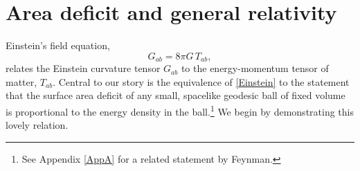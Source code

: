 \documentclass[aps,prd,showpacs,groupedaddress,nofootinbib,longbibliography,12pt]{revtex4-1}
\def\beq{\begin{equation}}
\def\eeq{\end{equation}}
\begin{document}

\section{Area deficit and general relativity}

Einstein's field equation, 
%
\beq\label{Einstein}
G_{ab} = 8\pi G\, T_{ab},
\eeq
%
relates the Einstein curvature tensor $G_{ab}$ to the energy-momentum tensor of matter, $T_{ab}$.
Central to our story is the equivalence of \eqref{Einstein} to 
the statement that the surface area deficit of any small, spacelike geodesic ball of fixed volume 
is proportional to the energy density in the ball.\footnote{See Appendix \ref{AppA} for a related statement by Feynman.}
We begin by demonstrating this lovely relation. 
\end{document}
